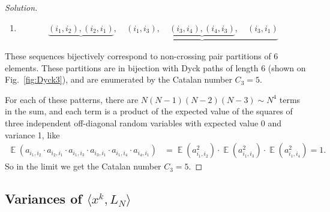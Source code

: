 \documentclass[letterpaper,11pt,oneside,reqno]{amsart}
\numberwithin{equation}{section}
\DeclareMathOperator{\EE}{\mathbb{E}}
\theoremstyle{definition}
\begin{document}
\begin{proof}[Solution]
\begin{enumerate}
	\item
	\begin{equation*}
	\underbrace{ ( i_1, i_2 ) , ( i_2 , i_1 ) } , \quad \underbrace{ ( i_1, i_3 ) , \quad \underbrace{ ( i_3, i_4 ) , ( i_4, i_3 ) } , \quad ( i_3, i_1 ) }
	\end{equation*}

	\end{enumerate}

	These sequences bijectively correspond to non-crossing pair partitions of 6 elements.
	These partitions are in bijection with Dyck paths of length 6
	(shown on Fig.~\ref{fig:Dyck3}), and are enumerated by the Catalan number $C_3=5$.

	For each of these patterns, there are $ N ( N - 1 ) ( N - 2 ) ( N - 3 ) \sim N^4 $ terms in the sum, and each term is a product of the expected value of the squares of three independent off-diagonal random variables with expected value 0 and variance 1, like
	\begin{align*}
	\EE ( a_{ i_1, i_2 } \cdot a_{ i_2 , i_1 } \cdot a_{ i_1, i_3 } \cdot a_{ i_3, i_1 } \cdot a_{ i_1, i_4 } \cdot a_{ i_4, i_1 } ) &= \EE( a_{ i_1, i_2 }^2 ) \cdot \EE( a_{ i_1, i_3 }^2 ) \cdot \EE( a_{ i_1, i_4 }^2 ) = 1.
	\end{align*}
	So in the limit we get the Catalan number $ C_3 = 5 $.
\end{proof}


\subsection{Variances of $\langle x^k,L_N\rangle$} %
\label{sub:variances_langle_x_k_l_nrangleto0_}
\end{document}
